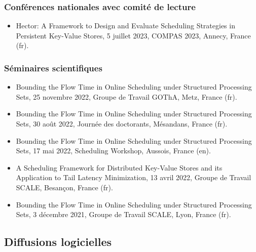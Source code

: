 \documentclass[12pt]{article}
\begin{document}
\subsubsection*{Conférences nationales avec comité de lecture}

\begin{itemize}
  \item \foreignlanguage{english}{Hector: A Framework to Design and Evaluate Scheduling Strategies
  in Persistent Key-Value Stores}, 5 juillet 2023, COMPAS 2023, Annecy, France (fr).
\end{itemize}

\subsubsection*{Séminaires scientifiques}

\begin{itemize}
  \item \foreignlanguage{english}{Bounding the Flow Time in Online Scheduling under Structured
  Processing Sets}, 25 novembre 2022, Groupe de Travail GOThA, Metz, France (fr).
  \item \foreignlanguage{english}{Bounding the Flow Time in Online Scheduling under Structured
  Processing Sets}, 30 août 2022, Journée des doctorants, Mésandans, France (fr).
  \item \foreignlanguage{english}{Bounding the Flow Time in Online Scheduling under Structured
  Processing Sets}, 17 mai 2022, Scheduling Workshop, Aussois, France (en).
  \item \foreignlanguage{english}{A Scheduling Framework for Distributed Key-Value Stores and its
  Application to Tail Latency Minimization}, 13 avril 2022, Groupe de Travail SCALE, Besançon,
  France (fr).
  \item \foreignlanguage{english}{Bounding the Flow Time in Online Scheduling under Structured
  Processing Sets}, 3 décembre 2021, Groupe de Travail SCALE, Lyon, France (fr).
\end{itemize}

\subsection{Diffusions logicielles}
\end{document}

